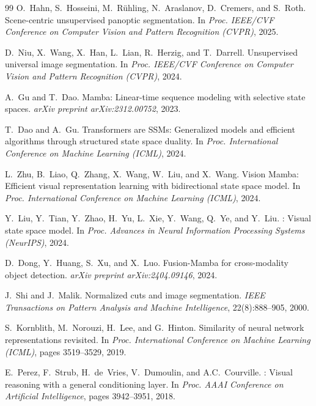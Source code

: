 \documentclass{article}
\begin{document}
\begin{thebibliography}{99}
O.~Hahn, S.~Hosseini, M.~R{\"u}hling, N.~Araslanov, D.~Cremers, and S.~Roth.
\newblock Scene-centric unsupervised panoptic segmentation.
\newblock In \emph{Proc. IEEE/CVF Conference on Computer Vision and Pattern Recognition (CVPR)}, 2025.

D.~Niu, X.~Wang, X.~Han, L.~Lian, R.~Herzig, and T.~Darrell.
\newblock Unsupervised universal image segmentation.
\newblock In \emph{Proc. IEEE/CVF Conference on Computer Vision and Pattern Recognition (CVPR)}, 2024.

A.~Gu and T.~Dao.
\newblock Mamba: Linear-time sequence modeling with selective state spaces.
\newblock \emph{arXiv preprint arXiv:2312.00752}, 2023.

T.~Dao and A.~Gu.
\newblock Transformers are {SSMs}: Generalized models and efficient algorithms through structured state space duality.
\newblock In \emph{Proc. International Conference on Machine Learning (ICML)}, 2024.

L.~Zhu, B.~Liao, Q.~Zhang, X.~Wang, W.~Liu, and X.~Wang.
\newblock Vision {M}amba: Efficient visual representation learning with bidirectional state space model.
\newblock In \emph{Proc. International Conference on Machine Learning (ICML)}, 2024.

Y.~Liu, Y.~Tian, Y.~Zhao, H.~Yu, L.~Xie, Y.~Wang, Q.~Ye, and Y.~Liu.
: Visual state space model.
\newblock In \emph{Proc. Advances in Neural Information Processing Systems (NeurIPS)}, 2024.

D.~Dong, Y.~Huang, S.~Xu, and X.~Luo.
\newblock Fusion-{M}amba for cross-modality object detection.
\newblock \emph{arXiv preprint arXiv:2404.09146}, 2024.

J.~Shi and J.~Malik.
\newblock Normalized cuts and image segmentation.
\newblock \emph{IEEE Transactions on Pattern Analysis and Machine Intelligence}, 22(8):888--905, 2000.

S.~Kornblith, M.~Norouzi, H.~Lee, and G.~Hinton.
\newblock Similarity of neural network representations revisited.
\newblock In \emph{Proc. International Conference on Machine Learning (ICML)}, pages 3519--3529, 2019.

E.~Perez, F.~Strub, H.~de~Vries, V.~Dumoulin, and A.C.~Courville.
: Visual reasoning with a general conditioning layer.
\newblock In \emph{Proc. AAAI Conference on Artificial Intelligence}, pages 3942--3951, 2018.


\end{thebibliography}
\end{document}
